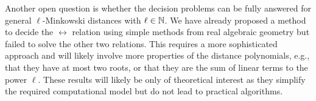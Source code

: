 Another open question is whether the decision problems can be fully answered for general \(\ell\)-Minkowski distances with \(\ell \in \mathbb{N}\). We have already proposed a method to decide the \(\leftrightarrow\) relation using simple methods from real algebraic geometry but failed to solve the other two relations. This requires a more sophisticated approach and will likely involve more properties of the distance polynomials, e.g., that they have at most two roots, or that they are the sum of linear terms to the power \(\ell\). These results will likely be only of theoretical interest as they simplify the required computational model but do not lead to practical algorithms. 

